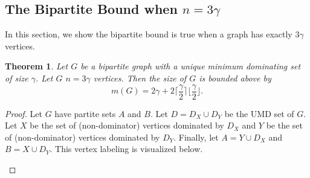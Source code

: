 \documentclass[12pt]{amsart}
\newtheorem{thm}{Theorem}
\begin{document}
\subsection{The Bipartite Bound when $n = 3\gamma$}\label{sect:n3g}
In this section, we show the bipartite bound is true when a graph has exactly $3\gamma$ vertices.
\begin{thm}\label{thm:n=3g}
    Let $G$ be a bipartite graph with a unique minimum dominating set of size $\gamma$. Let $G$ $n = 3\gamma$ vertices. Then the size of $G$ is bounded above by $$m(G) = 2\gamma + 2\Big\lceil\frac{\gamma}{2}\Big\rceil\Big\lfloor\frac{\gamma}{2}\Big\rfloor.$$
\end{thm}

\begin{proof}
     Let $G$ have partite sets $A$ and $B$. Let $D = D_X \cup D_Y$ be the UMD set of $G$. Let $X$ be the set of (non-dominator) vertices dominated by $D_X$ and $Y$  be the set of (non-dominator) vertices dominated by $D_Y$. Finally, let $A = Y \cup D_X$ and $B = X \cup D_Y$. This vertex labeling is visualized below.

\begin{figure}[H]
\centering
\end{figure}
\end{proof}
\end{document}
